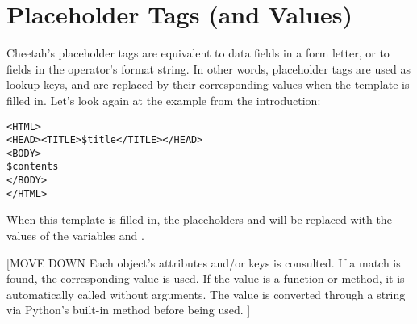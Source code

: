 \section{Placeholder Tags (and Values)}



Cheetah's placeholder tags are equivalent to data fields in a form letter, or to
 fields in the \code{\%} operator's format string.
In other words, placeholder tags are used as lookup keys, and are replaced by
their corresponding values when the template is filled in.
Let's look again at the example from the introduction:

\begin{verbatim}
<HTML>
<HEAD><TITLE>$title</TITLE></HEAD>
<BODY>
$contents
</BODY>
</HTML>
\end{verbatim}

When this template is filled in, the placeholders  and
 will be replaced with the values of the variables 
and .

[MOVE DOWN
Each object's attributes and/or
keys is consulted.  If a match is found, the corresponding value is used.
If the value is a function or method, it is automatically called without
arguments.  The value is converted through a string via Python's built-in
 method before being used.
]


